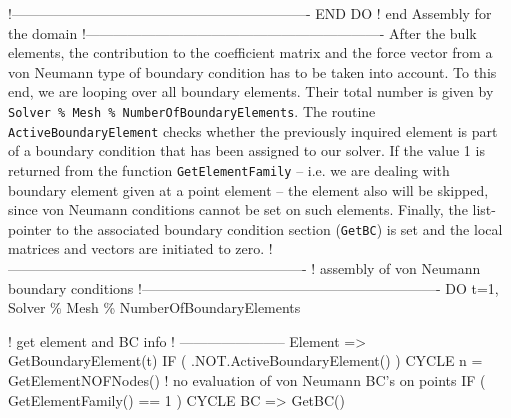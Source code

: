 !----------------------------------------------------------------
     END DO ! end Assembly for the domain
!----------------------------------------------------------------
\ttend
After the bulk elements, the contribution to the coefficient matrix and the force vector from a von Neumann type of boundary condition has to be taken into account. To this end, we are looping over all boundary elements. Their total number is given by \texttt{ Solver \% Mesh \% NumberOfBoundaryElements}. The routine \texttt{ActiveBoundaryElement} checks whether the previously inquired element is part of a boundary condition that has been  assigned to our solver. If the value 1 is returned from the function \texttt{GetElementFamily} -- i.e. we are dealing with boundary element given at a point element -- the element also will be skipped, since von Neumann conditions cannot be set on such elements.  Finally, the list-pointer to the associated boundary condition section (\texttt{GetBC}) is set and the local matrices and vectors are initiated to zero.
\ttbegin
!----------------------------------------------------------------
!     assembly of von Neumann boundary conditions
!----------------------------------------------------------------
     DO t=1, Solver \% Mesh \% NumberOfBoundaryElements

        ! get element and BC info
        ! -----------------------     
        Element => GetBoundaryElement(t)
        IF ( .NOT.ActiveBoundaryElement() ) CYCLE
        n = GetElementNOFNodes()
        ! no evaluation of von Neumann BC's on points
        IF ( GetElementFamily() == 1 ) CYCLE 
        BC => GetBC()
        
